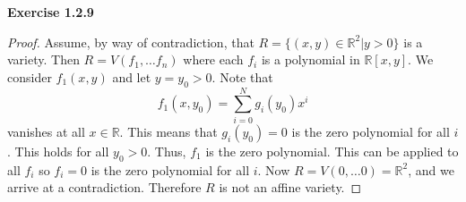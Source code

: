 \documentclass[12pt,oneside]{article}
\newenvironment{exercise}[1]{\vspace{.1in}\noindent\textbf{Exercise #1 \hspace{.05em}}}{}
\newcommand{\R}{\mathbb{R}}
\begin{document}

\begin{exercise}{1.2.9}
    \begin{proof}
        Assume, by way of contradiction, that $R = \{(x,y) \in \R^2 | y > 0\}$ is a 
        variety. Then $R = V(f_1,\ldots f_n)$ where each $f_i$ is a polynomial in $\R[x,y]$.
        We consider $f_1(x,y)$ and let $y = y_0 > 0$. Note that 
        \[
            f_1(x, y_0) = \sum_{i=0}^N g_i(y_0)x^i
        \]
        vanishes at all $x \in \R$. This means that $g_i(y_0) = 0$ is the zero polynomial 
        for all $i$. This holds for all $y_0 > 0$. Thus, $f_1$ is the zero polynomial. This 
        can be applied to all $f_i$ so $f_i = 0$ is the zero polynomial for all $i$. 
        Now $R = V(0, \ldots 0) = \R^2$, and we arrive at a contradiction. Therefore
        $R$ is not an affine variety.
    \end{proof}
\end{exercise}

\end{document}
